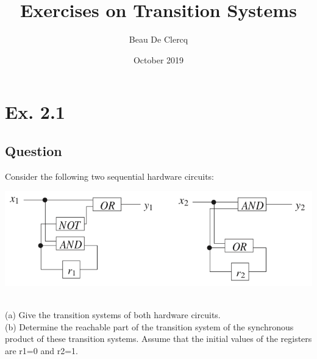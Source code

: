 \documentclass[12pt]{article}
\title{Exercises on Transition Systems}
\author{Beau De Clercq}
\date{October 2019}
\begin{document}
\maketitle{}

\tableofcontents

\clearpage
\newpage

\section*{Ex. 2.1}
\subsection*{Question}
Consider the following two sequential hardware circuits:\\
\begin{centering}
	\includegraphics*[width=\linewidth]{circuits.png}
\end{centering}
\\
(a) Give the transition systems of both hardware circuits.\\
(b) Determine the reachable part of the transition system of the synchronous product of these
transition systems. Assume that the initial values of the registers are r1=0 and r2=1.
\end{document}
